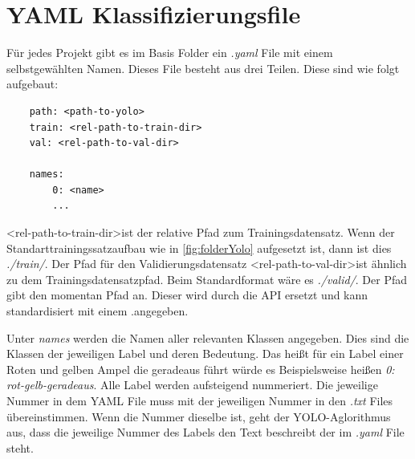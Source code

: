 \section{YAML Klassifizierungsfile}
\label{sec:yaml_class}

Für jedes Projekt gibt es im Basis Folder ein \textit{.yaml} File mit einem selbstgewählten Namen. Dieses File besteht aus drei Teilen. Diese sind wie folgt aufgebaut:
\begin{verbatim}
    path: <path-to-yolo>
    train: <rel-path-to-train-dir>
    val: <rel-path-to-val-dir>

    names:
        0: <name>
        ...
\end{verbatim}

\textless rel-path-to-train-dir\textgreater ist der relative Pfad zum Trainingsdatensatz. Wenn der Standarttrainingssatzaufbau wie in \autoref{fig:folderYolo} aufgesetzt ist, dann ist dies \textit{./train/}. Der Pfad für den Validierungsdatensatz \textless rel-path-to-val-dir\textgreater ist ähnlich zu dem Trainingsdatensatzpfad. Beim Standardformat wäre es \textit{./valid/}. Der Pfad gibt den momentan Pfad an. Dieser wird durch die API ersetzt und kann standardisiert mit einem  \glqq .\grqq angegeben.

Unter \textit{names} werden die Namen aller relevanten Klassen angegeben. Dies sind die Klassen der jeweiligen Label und deren Bedeutung. Das heißt für ein Label einer Roten und gelben Ampel die geradeaus führt würde es Beispielsweise heißen \textit{0: rot-gelb-geradeaus}. Alle Label werden aufsteigend nummeriert. Die jeweilige Nummer in dem YAML File muss mit der jeweiligen Nummer in den \textit{.txt} Files übereinstimmen. Wenn die Nummer dieselbe ist, geht der YOLO-Aglorithmus aus, dass die jeweilige Nummer des Labels den Text beschreibt der im \textit{.yaml} File steht.